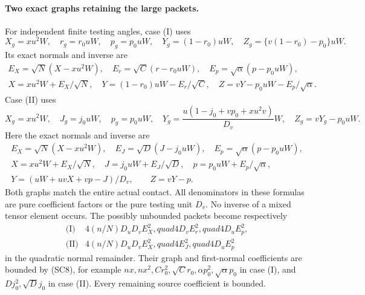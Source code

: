 \paragraph{Two exact graphs retaining the large packets.}
For independent finite testing angles, case (I) uses
\[
 X_g=xu^2W,\quad r_g=r_0uW,\quad p_g=p_0uW,
 \quad Y_g=(1-r_0)uW,\quad Z_g=\{v(1-r_0)-p_0\}uW.    \tag{SC9}
\]
Its exact normals and inverse are
\[
\begin{gathered}
 E_X=\sqrt N(X-xu^2W),\quad E_r=\sqrt C(r-r_0uW),
 \quad E_p=\sqrt\alpha(p-p_0uW),\\
 X=xu^2W+E_X/\sqrt N,\quad
 Y=(1-r_0)uW-E_r/\sqrt C,\quad
 Z=vY-p_0uW-E_p/\sqrt\alpha.                         
\end{gathered}
\tag{SC10}
\]
Case (II) uses
\[
 X_g=xu^2W,\quad J_g=j_0uW,\quad p_g=p_0uW,
 \quad Y_g=\frac{u(1-j_0+vp_0+xu^2v)}{D_v}W,
 \quad Z_g=vY_g-p_0uW.                              \tag{SC11}
\]
Here the exact normals and inverse are
\[
\begin{gathered}
 E_X=\sqrt N(X-xu^2W),\quad E_J=\sqrt D(J-j_0uW),
 \quad E_p=\sqrt\alpha(p-p_0uW),\\
 X=xu^2W+E_X/\sqrt N,\quad J=j_0uW+E_J/\sqrt D,
 \quad p=p_0uW+E_p/\sqrt\alpha,\\
 Y=(uW+uvX+vp-J)/D_v,\qquad Z=vY-p.                 
\end{gathered}
\tag{SC12}
\]
Both graphs match the entire actual contact. All denominators in
these formulas are pure coefficient factors or the pure testing
unit $D_v$. No inverse of a mixed tensor element occurs.
The possibly unbounded packets become respectively
\[
\begin{array}{ll}
 \text{(I)}&4(n/N)D_uD_vE_X^2,quad4D_vE_r^2,quad4D_uE_p^2,\\
 \text{(II)}&4(n/N)D_uD_vE_X^2,quad4E_J^2,quad4D_uE_p^2
\end{array}
\]
in the quadratic normal remainder. Their graph and first-normal
coefficients are bounded by (SC8), for example
$nx,nx^2,Cr_0^2,\sqrt C r_0,\alpha p_0^2,\sqrt\alpha p_0$
in case (I), and $Dj_0^2,\sqrt D j_0$ in case (II).
Every remaining source coefficient is bounded.

